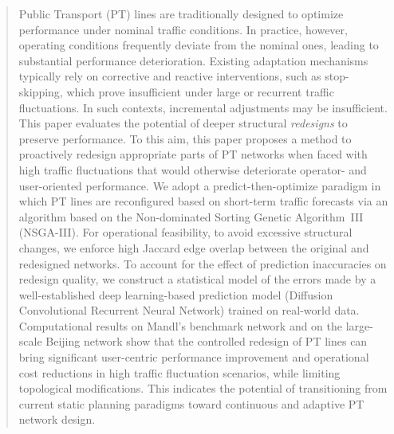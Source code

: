 \documentclass[a4paper,fleqn]{cas-sc}
\begin{document}

\begin{abstract}
Public Transport (PT) lines are traditionally designed to optimize performance under nominal traffic conditions. In practice, however, operating conditions frequently deviate from the nominal ones, leading to substantial performance deterioration. Existing adaptation mechanisms typically rely on corrective and reactive interventions, such as stop-skipping, which prove insufficient under large or recurrent traffic fluctuations. In such contexts, incremental adjustments may be insufficient. This paper evaluates the potential of deeper structural \emph{redesigns} to preserve performance.
%
To this aim, this paper proposes a method to proactively redesign appropriate parts of PT networks when faced with high traffic fluctuations that would otherwise deteriorate operator- and user-oriented performance. We adopt a predict-then-optimize paradigm in which PT lines are reconfigured based on short-term traffic forecasts via an algorithm based on the Non-dominated Sorting Genetic Algorithm~III (NSGA-III).
%
For operational feasibility, to avoid excessive structural changes, we enforce high Jaccard edge overlap between the original and redesigned networks. To account for the effect of prediction inaccuracies on redesign quality, we construct a statistical model of the errors made by a well-established deep learning-based prediction model (Diffusion Convolutional Recurrent Neural Network) trained on real-world data.
%
Computational results on Mandl's benchmark network and on the large-scale Beijing network show that the controlled redesign of PT lines can bring significant user-centric performance improvement and operational cost reductions in high traffic fluctuation scenarios, while limiting topological modifications. This indicates the potential of transitioning from current static planning paradigms toward continuous and adaptive PT network design.




%
\end{abstract}
\end{document}

